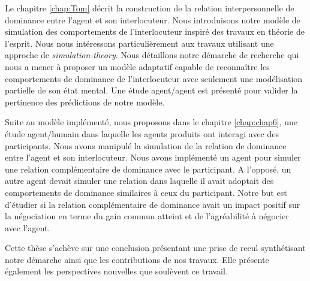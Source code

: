 Le chapitre \ref{chap:Tom} décrit la construction de la relation interpersonnelle de dominance entre l'agent et son interlocuteur. 
Nous introduisons notre modèle de simulation des comportements de l'interlocuteur inspiré des travaux en théorie de l'esprit. Nous nous intéressons particulièrement aux travaux utilisant une approche de \emph{simulation-theory}.
Nous détaillons notre démarche de recherche qui nous a mener à proposer un modèle adaptatif capable de reconnaître les comportements de dominance de l'interlocuteur avec seulement une modélisation partielle de son état mental.
Une étude agent/agent est présenté pour valider la pertinence des prédictions de notre modèle. 
 
Suite au modèle implémenté, nous proposons dans le chapitre \ref{chap:chap6}, une étude agent/humain dans laquelle les agents produits ont interagi avec des participants. Nous avons manipulé la simulation de la relation de dominance entre l'agent et son interlocuteur. Nous avons implémenté un agent pour simuler une relation complémentaire de dominance avec le participant. A l'opposé, un autre agent devait simuler une relation dans laquelle il avait adoptait des comportements de dominance similaires à ceux du participant. Notre but est d'étudier si la relation complémentaire de dominance avait un impact positif sur la négociation en terme du gain commun atteint et de l'agréabilité à négocier avec l'agent. 

Cette thèse s’achève sur une conclusion présentant une prise de recul synthétisant notre démarche ainsi que les contributions de nos travaux. Elle présente également les perspectives nouvelles que soulèvent ce travail.
